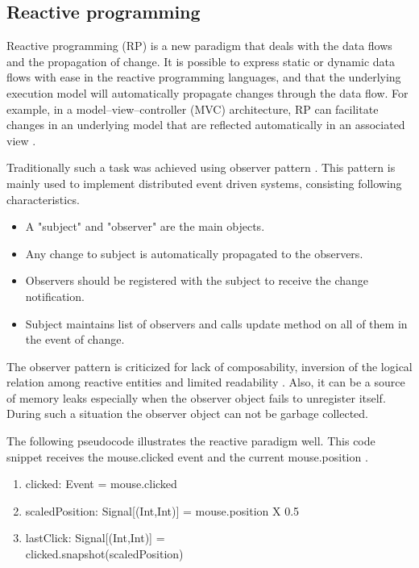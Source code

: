 \documentclass[conference]{IEEEtran}
\begin{document}
\subsection{Reactive programming}
Reactive programming (RP) is a new paradigm that deals with the data flows and the propagation of change. It is possible to express static or dynamic data flows with ease in the reactive programming languages, and that the underlying execution model will automatically propagate changes through the data flow. For example, in a model–view–controller (MVC) architecture, RP can facilitate changes in an underlying model that are reflected automatically in an associated view \cite{mvc}. \par
Traditionally such a task was achieved using observer pattern \cite{gof}. This pattern is mainly used to implement distributed event driven systems, consisting following characteristics.
\begin{itemize}
\item A "subject" and "observer" are the main objects.
\item Any change to subject is automatically propagated to the observers.
\item Observers should be registered with the subject to receive the change notification.
\item Subject maintains list of observers and calls update method on all of them in the event of change.
\end {itemize}
The observer pattern is criticized for lack of composability, inversion of the logical relation among reactive entities and limited readability \cite{observer}. Also, it can be a source of memory leaks especially when the observer object fails to unregister itself. During such a situation the observer object can not be garbage collected. \par

The following pseudocode \cite{reactive_walkthrough} illustrates the reactive paradigm well. This code snippet receives the mouse.clicked event and the current mouse.position .
\begin{enumerate}
\item clicked: Event = mouse.clicked
\item scaledPosition: Signal[(Int,Int)] = mouse.position X 0.5
\item lastClick: Signal[(Int,Int)] = \\
      clicked.snapshot(scaledPosition)
\end{enumerate}
\end{document}
